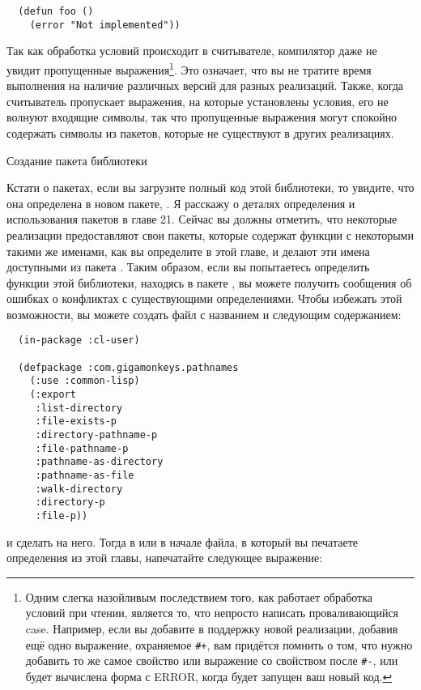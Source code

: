 \begin{lstlisting}
  (defun foo ()
    (error "Not implemented"))
\end{lstlisting}

Так как обработка условий происходит в считывателе, компилятор даже не увидит пропущенные
выражения\footnote{Одним слегка назойливым последствием того, как работает обработка
  условий при чтении, является то, что непросто написать проваливающийся case. Например,
  если вы добавите в  поддержку новой реализации, добавив ещё одно выражение,
  охраняемое \lstinline!#+!, вам придётся помнить о том, что нужно добавить то же самое
  свойство или выражение со свойством после \lstinline!#-!, или будет вычислена форма с
  ERROR, когда будет запущен ваш новый код.}. Это означает, что вы не тратите время
выполнения на наличие различных версий для разных реализаций. Также, когда считыватель
пропускает выражения, на которые установлены условия, его не волнуют входящие символы, так
что пропущенные выражения могут спокойно содержать символы из пакетов, которые не
существуют в других реализациях.

Создание пакета библиотеки

Кстати о пакетах, если вы загрузите полный код этой библиотеки, то увидите, что она
определена в новом пакете, . Я расскажу о деталях
определения и использования пакетов в главе 21. Сейчас вы должны отметить, что некоторые
реализации предоставляют свои пакеты, которые содержат функции с некоторыми такими же
именами, как вы определите в этой главе, и делают эти имена доступными из пакета
. Таким образом, если вы попытаетесь определить функции этой библиотеки,
находясь в пакете , вы можете получить сообщения об ошибках о конфликтах с
существующими определениями. Чтобы избежать этой возможности, вы можете создать файл с
названием  и следующим содержанием:

\begin{lstlisting}
  (in-package :cl-user)

  (defpackage :com.gigamonkeys.pathnames
    (:use :common-lisp)
    (:export
     :list-directory
     :file-exists-p
     :directory-pathname-p
     :file-pathname-p
     :pathname-as-directory
     :pathname-as-file
     :walk-directory
     :directory-p
     :file-p))
\end{lstlisting}

и сделать  на него. Тогда в  или в начале файла, в который вы
печатаете определения из этой главы, напечатайте следующее выражение:

